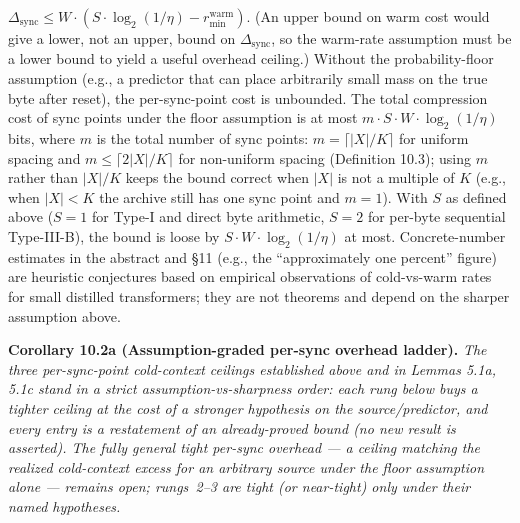\documentclass[
]{article}
\begin{document}
$\Delta_{\mathrm{sync}} \leq W \cdot (S \cdot \log_2(1/\eta) - r^{\mathrm{warm}}_{\min})$.
(An upper bound on warm cost would give a lower, not an upper,
bound on $\Delta_{\mathrm{sync}}$, so the warm-rate assumption must
be a lower bound to yield a useful overhead ceiling.) Without the
probability-floor assumption (e.g., a predictor that can place
arbitrarily small mass on the true byte after reset), the
per-sync-point cost is unbounded. The total compression cost of
sync points under the floor assumption is at most
$m \cdot S \cdot W \cdot \log_2(1/\eta)$ bits, where $m$ is the
total number of sync points: $m = \lceil |X|/K \rceil$ for uniform
spacing and $m \leq \lceil 2|X|/K \rceil$ for non-uniform spacing
(Definition 10.3); using $m$ rather than $|X|/K$ keeps the bound
correct when $|X|$ is not a multiple of $K$ (e.g., when $|X| < K$
the archive still has one sync point and $m = 1$). With $S$ as
defined above ($S = 1$ for Type-I and direct byte arithmetic,
$S = 2$ for per-byte sequential Type-III-B), the bound is loose
by $S \cdot W \cdot \log_2(1/\eta)$ at most.
Concrete-number estimates in the abstract and §11 (e.g., the
``approximately one percent'' figure) are heuristic conjectures
based on empirical observations of cold-vs-warm rates for small
distilled transformers; they are not theorems and depend on the
sharper assumption above.

\textbf{Corollary 10.2a (Assumption-graded per-sync overhead
ladder).} \emph{The three per-sync-point cold-context ceilings
established above and in Lemmas 5.1a, 5.1c stand in a strict
assumption-vs-sharpness order: each rung below buys a tighter
ceiling at the cost of a stronger hypothesis on the source/predictor,
and every entry is a restatement of an already-proved bound (no new
result is asserted). The fully general tight per-sync overhead --- a
ceiling matching the realized cold-context excess for an arbitrary
source under the floor assumption alone --- remains open; rungs~2--3
are tight (or near-tight) only under their named hypotheses.}
\end{document}
